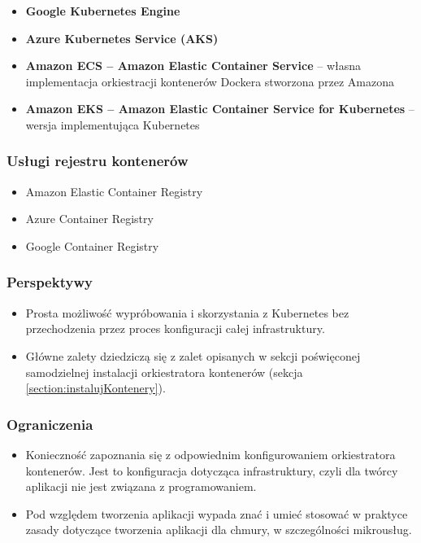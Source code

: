 \documentclass[12pt,a4paper,twoside,titlepage,openright]{book}
\begin{document}
\begin{itemize}
\item \textbf{Google Kubernetes Engine}
\item \textbf{Azure Kubernetes Service (AKS)}
\item \textbf{Amazon ECS -- Amazon Elastic Container Service} -- własna implementacja orkiestracji kontenerów Dockera stworzona przez Amazona
\item \textbf{Amazon EKS -- Amazon Elastic Container Service for Kubernetes} -- wersja implementująca Kubernetes
\end{itemize}

\subsubsection{Usługi rejestru kontenerów}

\begin{itemize}
\item Amazon Elastic Container Registry
\item Azure Container Registry
\item Google Container Registry
\end{itemize}

\subsubsection{Perspektywy}

\begin{itemize}
\item Prosta możliwość wypróbowania i skorzystania z Kubernetes bez przechodzenia przez proces konfiguracji całej infrastruktury.
\item Główne zalety dziedziczą się z zalet opisanych w sekcji poświęconej samodzielnej instalacji orkiestratora kontenerów (sekcja \ref{section:instalujKontenery}).
\end{itemize}

\subsubsection{Ograniczenia}
\begin{itemize}
\item Konieczność zapoznania się z odpowiednim konfigurowaniem orkiestratora kontenerów. Jest to konfiguracja dotycząca infrastruktury, czyli dla twórcy aplikacji nie jest związana z programowaniem.
\item Pod względem tworzenia aplikacji wypada znać i umieć stosować w praktyce zasady dotyczące tworzenia aplikacji dla chmury, w szczególności mikrousług.
\end{itemize}
\end{document}
